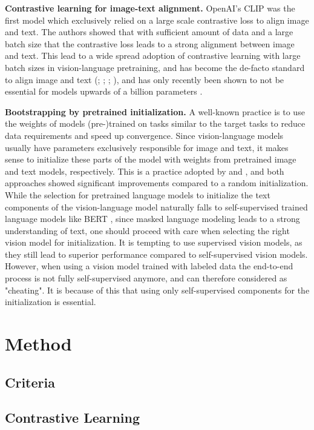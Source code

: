 \documentclass[10pt]{article} %
\begin{document}
\textbf{Contrastive learning for image-text alignment.}
OpenAI's CLIP \citep{clip} was the first model which exclusively relied on a large scale contrastive loss to align image and text. The authors showed that with sufficient amount of data and a large batch size that the contrastive loss leads to a strong alignment between image and text. This lead to a wide spread adoption of contrastive learning with large batch sizes in vision-language pretraining, and has become the de-facto standard to align image and text (\citet{coca}; \citet{vlmo}; \citet{flava}; \citet{filip}), and has only recently been shown to not be essential for models upwards of a billion parameters \citep{beit3}.

\textbf{Bootstrapping by pretrained initialization.} A well-known practice is to use the weights of models (pre-)trained on tasks similar to the target tasks to reduce data requirements and speed up convergence. Since vision-language models usually have parameters exclusively responsible for image and text, it makes sense to initialize these parts of the model with weights from pretrained image and text models, respectively. This is a practice adopted by \cite{vlmo} and \cite{flava}, and both approaches showed significant improvements compared to a random initialization. While the selection for pretrained language models to initialize the text components of the vision-language model naturally falls to self-supervised trained language models like BERT \citep{bert}, since masked language modeling leads to a strong understanding of text, one should proceed with care when selecting the right vision model for initialization. It is tempting to use supervised vision models, as they still lead to superior performance compared to self-supervised vision models. However, when using a vision model trained with labeled data the end-to-end process is not fully self-supervised anymore, and can therefore considered as "cheating". It is because of this that using only self-supervised components for the initialization is essential.

\section{Method}
\subsection{Criteria}
\subsection{Contrastive Learning}
\end{document}
